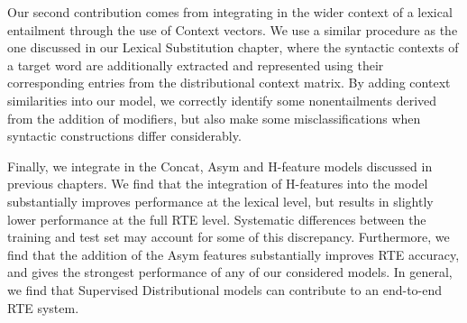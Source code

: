 Our second contribution comes from integrating in the wider context of a
lexical entailment through the use of Context vectors. We use a similar
procedure as the one discussed in our Lexical Substitution chapter, where the
syntactic contexts of a target word are additionally extracted and represented
using their corresponding entries from the distributional context matrix.
By adding context similarities into our model, we correctly identify some
nonentailments derived from the addition of modifiers, but also make some
misclassifications when syntactic constructions differ considerably.

Finally, we integrate in the Concat, Asym and H-feature models discussed in
previous chapters. We find that the integration of H-features into the model
substantially improves performance at the lexical level, but results in
slightly lower performance at the full RTE level. Systematic differences
between the training and test set may account for some of this discrepancy.
Furthermore, we find that the addition of the Asym features substantially
improves RTE accuracy, and gives the strongest performance of any of our
considered models. In general, we find that Supervised Distributional models
can contribute to an end-to-end RTE system.

